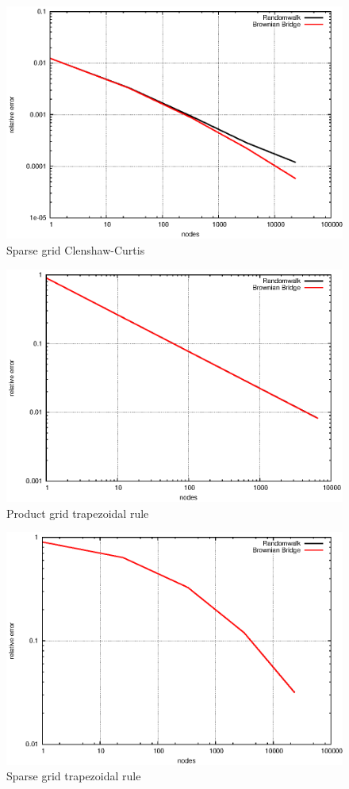 \documentclass[]{article}
\begin{document}
\begin{figure}[!ht]
\includegraphics{task16_ccsparse}
\caption{Sparse grid Clenshaw-Curtis}
\label{fig:Task16b}
\end{figure}

\begin{figure}[!ht]
\includegraphics{task16_trapprod}
\caption{Product grid trapezoidal rule}
\label{fig:Task16c}
\end{figure}

\begin{figure}[!ht]
\includegraphics{task16_trapsparse}
\caption{Sparse grid trapezoidal rule}
\label{fig:Task16d}
\end{figure}
\end{document}
